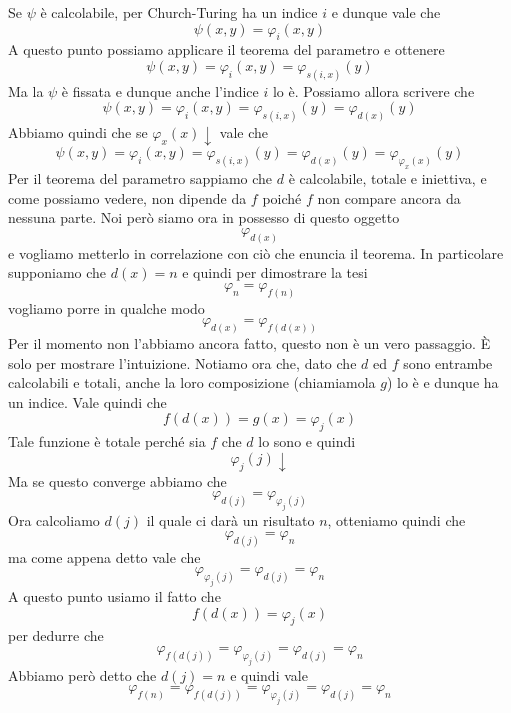 Se $\psi$ è calcolabile, per Church-Turing ha un indice $i$
e dunque vale che
\[ \psi (x, y) = \varphi_i (x, y) \]
A questo punto possiamo applicare il teorema del parametro e
ottenere
\[ \psi (x, y) = \varphi_i (x, y) = \varphi_{s(i, x)} (y) \]
Ma la $\psi$ è fissata e dunque anche l'indice $i$ lo è. Possiamo
allora scrivere che
\[
	\psi (x, y) = \varphi_i (x, y) = \varphi_{s(i, x)} (y) =
	\varphi_{d(x)} (y)
\]
Abbiamo quindi che se $\varphi_x (x) \downarrow$ vale che
\[
	\psi (x, y) = \varphi_i (x, y) = \varphi_{s(i, x)} (y) =
	\varphi_{d(x)} (y) = \varphi_{\varphi_x(x)} (y)
\]
Per il teorema del parametro sappiamo che $d$ è calcolabile,
totale e iniettiva, e come possiamo vedere, non dipende da $f$
poiché $f$ non compare ancora da nessuna parte. Noi però siamo
ora in possesso di questo oggetto
\[ \varphi_{d(x)} \]
e vogliamo metterlo in correlazione con ciò che enuncia il
teorema. In particolare supponiamo che $d(x) = n$ e quindi
per dimostrare la tesi
\[ \varphi_n = \varphi_{f(n)} \]
vogliamo porre in qualche modo
\[ \varphi_{d(x)} = \varphi_{f(d(x))} \]
Per il momento non l'abbiamo ancora fatto, questo non è un vero
passaggio. \`E solo per mostrare l'intuizione. Notiamo ora che,
dato che $d$ ed $f$ sono entrambe calcolabili e totali, anche la
loro composizione (chiamiamola $g$) lo è e dunque ha un indice.
Vale quindi che
\[ f(d(x)) = g(x) = \varphi_j (x) \]
Tale funzione è totale perché sia $f$ che $d$ lo sono e quindi
\[ \varphi_j (j) \downarrow \]
Ma se questo converge abbiamo che
\[ \varphi_{d(j)} = \varphi_{\varphi_j(j)} \]
Ora calcoliamo $d(j)$ il quale ci darà un risultato $n$,
otteniamo quindi che
\[ \varphi_{d(j)} = \varphi_n \]
ma come appena detto vale che
\[ \varphi_{\varphi_j(j)} = \varphi_{d(j)} = \varphi_n \]
A questo punto usiamo il fatto che
\[ f(d(x)) = \varphi_j (x) \]
per dedurre che
\[
	\varphi_{f(d(j))} = \varphi_{\varphi_j(j)} =
	\varphi_{d(j)} = \varphi_n
\]
Abbiamo però detto che $d(j) = n$ e quindi vale
\[
	\varphi_{f(n)} = \varphi_{f(d(j))} =
	\varphi_{\varphi_j(j)} = \varphi_{d(j)} = \varphi_n
\]

